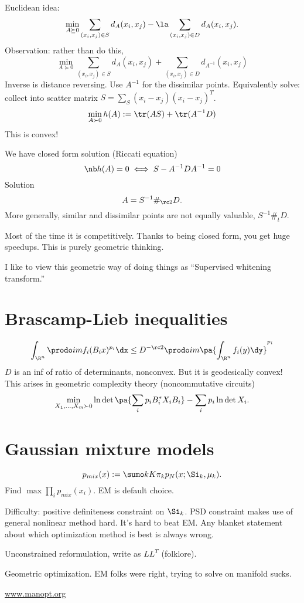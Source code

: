 Euclidean idea:
$$
\min_{A\succeq 0}\sum_{(x_i,x_j)\in S} d_A(x_i,x_j) - \la \sum_{(x_i,x_j)\in D} d_A(x_i,x_j).
$$
Observation: rather than do this, 
$$
\min_{A\succeq 0} \sum_{(x_i,x_j)\in S} d_A(x_i,x_j) + \sum_{(x_i,x_j)\in D} d_{A^{-1}}(x_i,x_j)
$$
Inverse is distance reversing. Use $A^{-1}$ for the dissimilar points. Equivalently solve: collect into scatter matrix $S=\sum_{S} (x_i-x_j)(x_i-x_j)^T$.
$$
\min_{A\succ 0} h(A) := \tr(AS)+\tr(A^{-1}D)
$$
This is convex!

We have closed form solution (Riccati equation)
$$
\nb h(A) = 0 \iff S-A^{-1}DA^{-1}=0
$$
Solution
$$
A=S^{-1}\#_{\rc 2}D.
$$
More generally, similar and dissimilar points are not equally valuable, $S^{-1}\#_t D$. %

Most of the time it is competitively. Thanks to being closed form, you get huge speedups. This is purely geometric thinking. 


I like to view this geometric way of doing things as ``Supervised whitening transform.''

\section{Brascamp-Lieb inequalities}
$$
\int_{\R^n} \prodo im f_i(B_ix)^{p_i}\dx \le D^{-\rc 2} \prodo im \pa{\int_{\R^n} f_i(y)\dy}^{p_i}
$$
$D$ is an inf of ratio of determinants, nonconvex. But it is geodesically convex!
This arises in geometric complexity theory (noncommutative circuits)
$$
\min_{X_1,\ldots, X_m\succ 0} \ln \det \pa{\sum_i p_iB_i^*X_iB_i} - \sum_i p_i \ln \det X_i.
$$

\section{Gaussian mixture models}
$$
p_{mix}(x):=\sumo kK \pi_k p_N(x;\Si_k, \mu_k).
$$
Find $\max\prod_i p_{mix}(x_i)$. EM is default choice. 

Difficulty: positive definiteness constraint on $\Si_k$. 
PSD constraint makes use of general nonlinear method hard. It's hard to beat EM. Any blanket statement about which optimization method is best is always wrong.

Unconstrained reformulation, write as $LL^T$ (folklore).

Geometric optimization. EM folks were right, trying to solve on manifold sucks. 

\url{www.manopt.org}

